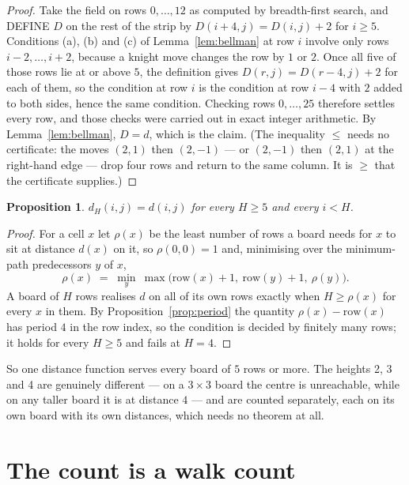 \documentclass[11pt,a4paper]{article}
\theoremstyle{plain}
\newtheorem{proposition}[theorem]{Proposition}
\theoremstyle{definition}
\begin{document}
\begin{proof}
Take the field on rows $0,\dots,12$ as computed by breadth-first search, and DEFINE $D$ on the rest of the strip by $D(i+4,j)=D(i,j)+2$ for $i\ge5$. Conditions (a), (b) and (c) of Lemma~\ref{lem:bellman} at row $i$ involve only rows $i-2,\dots,i+2$, because a knight move changes the row by $1$ or $2$. Once all five of those rows lie at or above $5$, the definition gives $D(r,j)=D(r-4,j)+2$ for each of them, so the condition at row $i$ is the condition at row $i-4$ with $2$ added to both sides, hence the same condition. Checking rows $0,\dots,25$ therefore settles every row, and those checks were carried out in exact integer arithmetic. By Lemma~\ref{lem:bellman}, $D=d$, which is the claim. (The inequality $\le$ needs no certificate: the moves $(2,1)$ then $(2,-1)$ --- or $(2,-1)$ then $(2,1)$ at the right-hand edge --- drop four rows and return to the same column. It is $\ge$ that the certificate supplies.)
\end{proof}

\begin{proposition}\label{prop:height}
$d_H(i,j)=d(i,j)$ for every $H\ge5$ and every $i<H$.
\end{proposition}

\begin{proof}
For a cell $x$ let $\rho(x)$ be the least number of rows a board needs for $x$ to sit at distance $d(x)$ on it, so $\rho(0,0)=1$ and, minimising over the minimum-path predecessors $y$ of $x$,
\[ \rho(x)\;=\;\min_y\ \max\bigl(\mathrm{row}(x)+1,\ \mathrm{row}(y)+1,\ \rho(y)\bigr). \]
A board of $H$ rows realises $d$ on all of its own rows exactly when $H\ge\rho(x)$ for every $x$ in them. By Proposition~\ref{prop:period} the quantity $\rho(x)-\mathrm{row}(x)$ has period $4$ in the row index, so the condition is decided by finitely many rows; it holds for every $H\ge5$ and fails at $H=4$.
\end{proof}

So one distance function serves every board of $5$ rows or more. The heights 2, 3 and 4 are genuinely different --- on a $3\times3$ board the centre is unreachable, while on any taller board it is at distance $4$ --- and are counted separately, each on its own board with its own distances, which needs no theorem at all.

\section{The count is a walk count}
\end{document}
